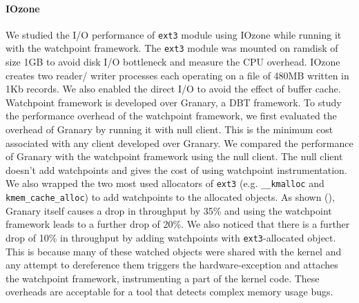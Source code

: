 \documentclass[letterpaper,twocolumn,10pt]{article}
\begin{document}
\paragraph*{IOzone} We studied the I/O performance of \texttt{ext3} module using IOzone while running it with the watchpoint framework.
The \texttt{ext3} module was mounted on ramdisk of size 1GB to avoid disk I/O bottleneck and measure the CPU overhead. IOzone creates two reader/ writer processes each operating on a file of 480MB written in 1Kb records. We also enabled the direct I/O to avoid the effect of buffer cache. Watchpoint framework is developed over Granary, a DBT framework. To study the performance overhead of the watchpoint framework, we first evaluated the overhead of Granary by running it with null client. This is the minimum cost associated with any client developed over Granary. We compared the performance of Granary with the watchpoint framework using the null client. The null client doesn't add watchpoints and gives the cost of using watchpoint instrumentation. We also wrapped the two most used allocators of \texttt{ext3} (e.g. \texttt{\_\_kmalloc} and \texttt{kmem\_cache\_alloc}) to add watchpoints to the allocated objects. 
As shown (), Granary itself causes a drop in throughput by {\texttildelow}35\% and using the watchpoint framework leads to a further drop of {\texttildelow}20\%. We also noticed that there is a further drop of {\texttildelow}10\% in throughput by adding watchpoints with \texttt{ext3}-allocated object. This is because many of these watched objects were shared with the kernel and any attempt to dereference them triggers the hardware-exception and attaches the watchpoint framework, instrumenting a part of the kernel code. These overheads are acceptable for a tool that detects complex memory usage bugs.











\end{document}
